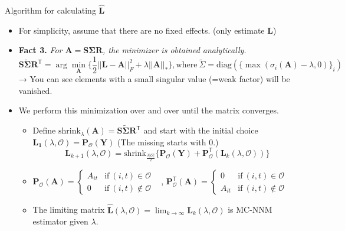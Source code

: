 \documentclass[xcolor=svgnames,aspectratio=169]{beamer}
\begin{document}
\begin{frame}{Algorithm for calculating $\hat{\mathbf{L}}$}
    \begin{itemize}
        \item For simplicity, assume that there are no fixed effects. (only estimate $\mathbf{L}$)
        \item \textbf{Fact 3.} \textit{For $\mathbf{A=S\Sigma R}$, the minimizer is obtained analytically.}
        \[
        \mathbf{S\tilde{\Sigma}R^\mathsf{T}}=\arg\min_{\mathbf{A}}\{\frac{1}{2}||\mathbf{L-A}||_F^2+\lambda||\mathbf{A}||_*\}, \text{where} \ \tilde{\Sigma}=\text{diag}(\{\max(\sigma_i(\mathbf{A})-\lambda,0)\}_i)
        \]
        → You can see elements with a small singular value (=weak factor) will be vanished.
        \item We perform this minimization over and over until the matrix converges.
        \begin{itemize}
            \item Define $\text{shrink}_{\lambda}(\mathbf{A})=\mathbf{S\tilde{\Sigma}R^\mathsf{T}}$ and start with the initial choice $\mathbf{L_1}(\lambda, \mathcal{O})=\mathbf{P}_\mathcal{O} (\mathbf{Y})$ (The missing starts with $0$.)
            \[
            \mathbf{L}_{k+1}(\lambda,\mathcal{O} )=\text{shrink}_{\frac{\lambda|\mathcal{O} |}{2}}\{\mathbf{P}_{\mathcal{O} }(\mathbf{Y})+\mathbf{P}_{\mathcal{O} }^\mathsf{T}(\mathbf{L}_k(\lambda,\mathcal{O} ))\}
            \]
            \item $\mathbf{P_{\mathcal{O} }}(\mathbf{A})=
            \begin{cases}
                A_{it} & \text{if} \ (i,t)\in\mathcal{O} \\ 0 & \text{if} \ (i,t) \notin \mathcal{O}  
            \end{cases}$ \ , \quad $\mathbf{P_{\mathcal{O} }^\mathsf{T}}(\mathbf{A})=
            \begin{cases}
                0 & \text{if} \ (i,t)\in\mathcal{O} \\ A_{it} & \text{if} \ (i,t) \notin \mathcal{O}  
            \end{cases}$
            \item The limiting matrix $\hat{\mathbf{L}}(\lambda,\mathcal{O} )=\lim_{k\to \infty} \mathbf{L}_k(\lambda,\mathcal{O} )$ is MC-NNM estimator given $\lambda$.
        \end{itemize}
    \end{itemize}
\end{frame}
\end{document}
